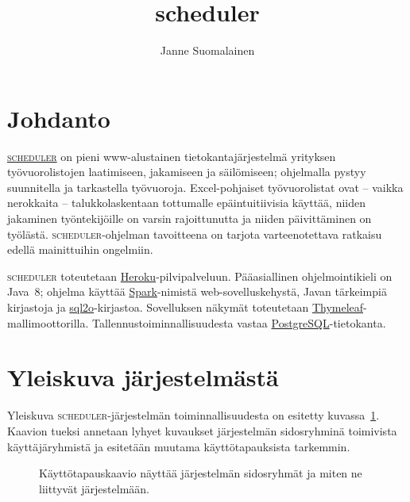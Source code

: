 \documentclass[10pt,titlepage,hidelinks]{scrartcl}
\newcommand{\scheduler}{\textsc{scheduler}}
\begin{document}
\title{scheduler}
\author{Janne Suomalainen}
\maketitle

\tableofcontents\clearpage

\section{Johdanto}

\href{https://onlinescheduler.herokuapp.com/}{\scheduler{}} on pieni www-alustainen tietokantajärjestelmä yrityksen työvuorolistojen laatimiseen, jakamiseen ja säilömiseen; ohjelmalla pystyy suunnitella ja tarkastella työvuoroja. Excel-pohjaiset työvuorolistat ovat -- vaikka nerokkaita -- talukkolaskentaan tottumalle epäintuitiivisia käyttää, niiden jakaminen työntekijöille on varsin rajoittunutta ja niiden päivittäminen on työlästä. \scheduler{}-ohjelman tavoitteena on tarjota varteenotettava ratkaisu edellä mainittuihin ongelmiin.

\scheduler{} toteutetaan \href{https://www.heroku.com/}{Heroku}-pilvipalveluun. Pääasiallinen ohjelmointikieli on Java~8; ohjelma käyttää \href{http://sparkjava.com/}{Spark}-nimistä web-sovelluskehystä, Javan tärkeimpiä kirjastoja ja \href{http://www.sql2o.org/}{sql2o}-kirjastoa. Sovelluksen näkymät toteutetaan \href{https://www.thymeleaf.org/}{Thymeleaf}-mallimoottorilla. Tallennustoiminnallisuudesta vastaa \href{https://www.postgresql.org/}{PostgreSQL}-tietokanta.

\section{Yleiskuva järjestelmästä}

Yleiskuva \scheduler{}-järjestelmän toiminnallisuudesta on esitetty kuvassa~\ref{fig:kayttotapaukset}. Kaavion tueksi annetaan lyhyet kuvaukset järjestelmän sidosryhminä toimivista käyttäjäryhmistä ja esitetään muutama käyttötapauksista tarkemmin.

\begin{figure}[tb]
\centering
{}
\caption{Käyttötapauskaavio näyttää järjestelmän sidosryhmät ja miten ne liittyvät järjestelmään.}
\label{fig:kayttotapaukset}
\end{figure}
\end{document}
